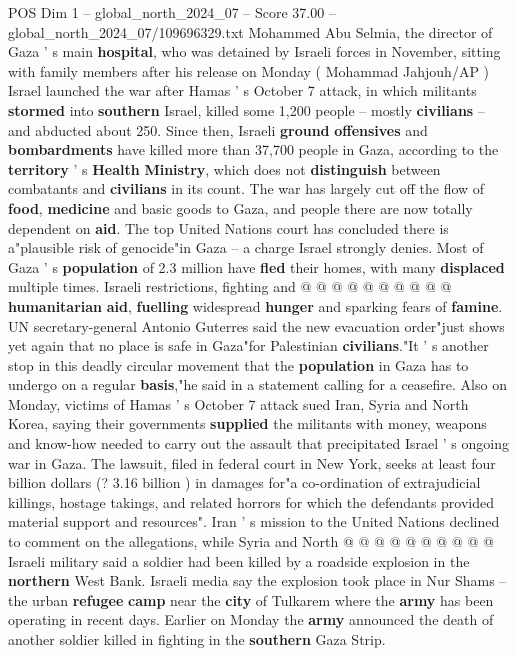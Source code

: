 \begin{textsample}{POS Dim 1 – global\_north\_2024\_07 – Score 37.00 – global\_north\_2024\_07/109696329.txt}
Mohammed Abu Selmia, the director of Gaza ' s main \textbf{hospital}, who was detained by Israeli forces in November, sitting with family members after his release on Monday ( Mohammad Jahjouh/AP ) Israel launched the war after Hamas ' s October 7 attack, in which militants \textbf{stormed} into \textbf{southern} Israel, killed some 1,200 people -- mostly \textbf{civilians} -- and abducted about 250.
Since then, Israeli \textbf{ground} \textbf{offensives} and \textbf{bombardments} have killed more than 37,700 people in Gaza, according to the \textbf{territory} ' s \textbf{Health} \textbf{Ministry}, which does not \textbf{distinguish} between combatants and \textbf{civilians} in its count.
The war has largely cut off the flow of \textbf{food}, \textbf{medicine} and basic goods to Gaza, and people there are now totally dependent on \textbf{aid}.
The top United Nations court has concluded there is a"plausible risk of genocide"in Gaza -- a charge Israel strongly denies.
Most of Gaza ' s \textbf{population} of 2.3 million have \textbf{fled} their homes, with many \textbf{displaced} multiple times.
Israeli restrictions, fighting and @ @ @ @ @ @ @ @ @ @ \textbf{humanitarian} \textbf{aid}, \textbf{fuelling} widespread \textbf{hunger} and sparking fears of \textbf{famine}.
UN secretary-general Antonio Guterres said the new evacuation order"just shows yet again that no place is safe in Gaza"for Palestinian \textbf{civilians}."It ' s another stop in this deadly circular movement that the \textbf{population} in Gaza has to undergo on a regular \textbf{basis},"he said in a statement calling for a ceasefire.
Also on Monday, victims of Hamas ' s October 7 attack sued Iran, Syria and North Korea, saying their governments \textbf{supplied} the militants with money, weapons and know-how needed to carry out the assault that precipitated Israel ' s ongoing war in Gaza.
The lawsuit, filed in federal court in New York, seeks at least four billion dollars (? 3.16 billion ) in damages for"a co-ordination of extrajudicial killings, hostage takings, and related horrors for which the defendants provided material support and resources".
Iran ' s mission to the United Nations declined to comment on the allegations, while Syria and North @ @ @ @ @ @ @ @ @ @ Israeli military said a soldier had been killed by a roadside explosion in the \textbf{northern} West Bank.
Israeli media say the explosion took place in Nur Shams -- the urban \textbf{refugee} \textbf{camp} near the \textbf{city} of Tulkarem where the \textbf{army} has been operating in recent days.
Earlier on Monday the \textbf{army} announced the death of another soldier killed in fighting in the \textbf{southern} Gaza Strip.

\end{textsample}
